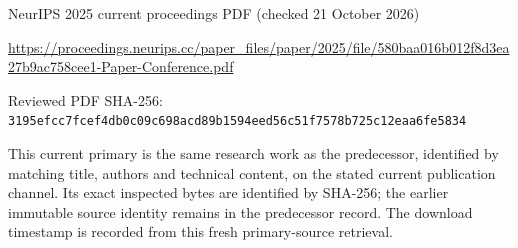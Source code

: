 \documentclass[11pt]{article}
\begin{document}
NeurIPS 2025 current proceedings PDF (checked 21 October 2026)

\url{https://proceedings.neurips.cc/paper_files/paper/2025/file/580baa016b012f8d3ea27b9ac758cee1-Paper-Conference.pdf}

Reviewed PDF SHA-256: \nolinkurl{3195efcc7fcef4db0c09c698acd89b1594eed56c51f7578b725c12eaa6fe5834}

This current primary is the same research work as the predecessor, identified by matching title, authors and technical content, on the stated current publication channel. Its exact inspected bytes are identified by SHA-256; the earlier immutable source identity remains in the predecessor record. The download timestamp is recorded from this fresh primary-source retrieval.
\end{document}
